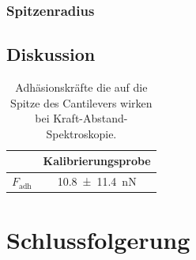 \documentclass[
	a4paper,
	12pt,
	pagesize,
	ngerman
]{scrartcl}
\begin{document}
	\subsubsection{Spitzenradius} %
		\subsection{Diskussion}

\begin{table}[H]
		\centering
		\begin{tabular}{ c | c }
			 & Kalibrierungsprobe\\ \hline
			$F_\text{adh}$ & \SI{10.8+-11.4}{nN} \\
		\end{tabular}
		\caption{Adhäsionskräfte die auf die Spitze des Cantilevers wirken bei Kraft-Abstand-Spektroskopie.} %
		\label{tb_ds}
	\end{table}


	\section{Schlussfolgerung}

\end{document}
